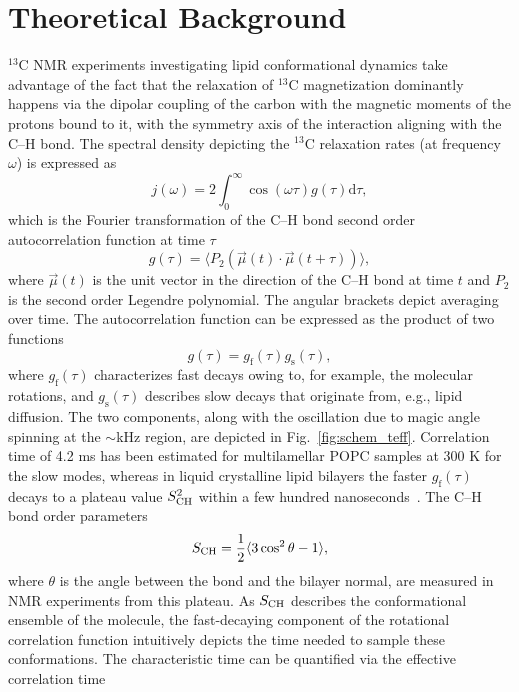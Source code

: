 \documentclass[journal=jpcbfk,manuscript=article,layout=twocolumn]{achemso}
\begin{document}
\section{Theoretical Background}\label{sec:theory}
$^{13}$C NMR experiments investigating lipid conformational dynamics take advantage of the fact that the relaxation of $^{13}$C magnetization dominantly happens via the dipolar coupling of the carbon with the magnetic moments of the protons bound to it, with the symmetry axis of the interaction aligning with the C--H bond. The spectral density depicting the $^{13}$C relaxation rates (at frequency $\omega$) is expressed as
\begin{equation}
j{(\omega)}=2\int_{0}^{\infty}\cos(\omega\tau)g(\tau)\mathrm d\tau ,
\end{equation}
which is the Fourier transformation of the C--H bond second order autocorrelation function at time $\tau$
\begin{equation}
\label{eq:BCF}
g(\tau)=\langle P_{2}\left(\vec{\mu}(t)\cdot \vec{\mu}(t+\tau)\right)\rangle ,
\end{equation}
where $\vec{\mu}(t)$ is the unit vector in the direction of the C--H bond at time $t$ and $P_{2}$ is the second order Legendre polynomial. The angular brackets depict averaging over time. The autocorrelation function can be expressed as the product of two functions
\begin{equation}
g(\tau)=g_{\mathrm{f}}(\tau)g_{\mathrm{s}}(\tau) ,
\end{equation} 
where $g_{\mathrm{f}}(\tau)$ characterizes fast decays owing to, for example, the molecular  rotations, and $g_{\mathrm{s}}(\tau)$ describes slow decays that originate from, e.g., lipid diffusion. The two components, along with the oscillation due to magic angle spinning at the $\sim$kHz region, are depicted in Fig.~\ref{fig:schem_teff}. Correlation time of 4.2 ms has been estimated for multilamellar POPC samples at 300 K for the slow modes, whereas  in liquid crystalline lipid bilayers the faster $g_{\mathrm{f}}(\tau)$ decays to a plateau value $S^{2}_{\rm{CH}}$ within a few hundred nanoseconds~\cite{ferreira15}. The C--H bond order parameters
\begin{equation}
\label{eq:OP}
S_{\rm{CH}}=\frac{1}{2}\langle 3\cos^{2}\theta-1\rangle ,
\end{equation}
where $\theta$ is the angle between the bond and the bilayer normal, are measured in NMR experiments from this plateau. As $S_{\rm{CH}}$ describes the conformational ensemble of the molecule, the fast-decaying component of the rotational correlation function intuitively depicts the time needed to sample these conformations. The characteristic time can be quantified via the effective correlation time
\end{document}
